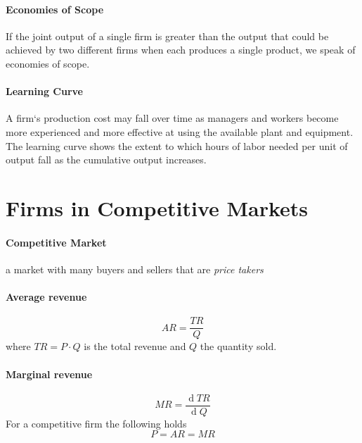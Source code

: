 \documentclass[a4paper,titlepage] {scrartcl}
\begin{document}
\paragraph{Economies of Scope} %
\label{par:economies_of_scope}
If the joint output of a single firm is greater than 
the output that could be achieved by two different 
firms when each produces a single product, we speak 
of economies of scope.

\paragraph{Learning Curve} %
\label{par:learning_curve}
A firm‘s production cost may fall over time as managers and workers 
become more experienced and more effective at using the available 
plant and equipment. The learning curve shows the extent to which 
hours of labor needed per unit of output fall as the cumulative output 
increases. 



\section{Firms in Competitive Markets}
\paragraph{Competitive Market} %
\label{par:competitive_market}
a market with many buyers and sellers that are \emph{price takers}		

\paragraph{Average revenue} %
\label{par:average_revenue}
\begin{equation}
	AR = \frac{TR}{Q}
\end{equation}
where $TR=P\cdot Q$ is the total revenue and $Q$ the quantity sold.

\paragraph{Marginal revenue} %
\label{par:marginal_revenue}
\begin{equation}
	MR = \frac{\operatorname{d}TR}{\operatorname{d}Q}
\end{equation}
For a competitive firm the following holds
\begin{equation}
	P = AR = MR
\end{equation}
\end{document}
